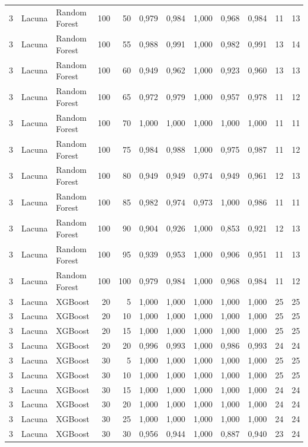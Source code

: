 \begin{longtable}{@{}rllrrrrrrrrr@{}}
3 & Lacuna & Random Forest & 100 & 50 & 0,979 & 0,984 & 1,000 & 0,968 & 0,984 & 11 & 13 \\
3 & Lacuna & Random Forest & 100 & 55 & 0,988 & 0,991 & 1,000 & 0,982 & 0,991 & 13 & 14 \\
3 & Lacuna & Random Forest & 100 & 60 & 0,949 & 0,962 & 1,000 & 0,923 & 0,960 & 13 & 13 \\
3 & Lacuna & Random Forest & 100 & 65 & 0,972 & 0,979 & 1,000 & 0,957 & 0,978 & 11 & 12 \\
3 & Lacuna & Random Forest & 100 & 70 & 1,000 & 1,000 & 1,000 & 1,000 & 1,000 & 11 & 11 \\
3 & Lacuna & Random Forest & 100 & 75 & 0,984 & 0,988 & 1,000 & 0,975 & 0,987 & 11 & 12 \\
3 & Lacuna & Random Forest & 100 & 80 & 0,949 & 0,949 & 0,974 & 0,949 & 0,961 & 12 & 13 \\
3 & Lacuna & Random Forest & 100 & 85 & 0,982 & 0,974 & 0,973 & 1,000 & 0,986 & 11 & 11 \\
3 & Lacuna & Random Forest & 100 & 90 & 0,904 & 0,926 & 1,000 & 0,853 & 0,921 & 12 & 13 \\
3 & Lacuna & Random Forest & 100 & 95 & 0,939 & 0,953 & 1,000 & 0,906 & 0,951 & 11 & 13 \\
3 & Lacuna & Random Forest & 100 & 100 & 0,979 & 0,984 & 1,000 & 0,968 & 0,984 & 11 & 12 \\
3 & Lacuna & XGBoost & 20 & 5 & 1,000 & 1,000 & 1,000 & 1,000 & 1,000 & 25 & 25 \\
3 & Lacuna & XGBoost & 20 & 10 & 1,000 & 1,000 & 1,000 & 1,000 & 1,000 & 25 & 25 \\
3 & Lacuna & XGBoost & 20 & 15 & 1,000 & 1,000 & 1,000 & 1,000 & 1,000 & 25 & 25 \\
3 & Lacuna & XGBoost & 20 & 20 & 0,996 & 0,993 & 1,000 & 0,986 & 0,993 & 24 & 24 \\
3 & Lacuna & XGBoost & 30 & 5 & 1,000 & 1,000 & 1,000 & 1,000 & 1,000 & 25 & 25 \\
3 & Lacuna & XGBoost & 30 & 10 & 1,000 & 1,000 & 1,000 & 1,000 & 1,000 & 25 & 25 \\
3 & Lacuna & XGBoost & 30 & 15 & 1,000 & 1,000 & 1,000 & 1,000 & 1,000 & 24 & 24 \\
3 & Lacuna & XGBoost & 30 & 20 & 1,000 & 1,000 & 1,000 & 1,000 & 1,000 & 24 & 24 \\
3 & Lacuna & XGBoost & 30 & 25 & 1,000 & 1,000 & 1,000 & 1,000 & 1,000 & 24 & 24 \\
3 & Lacuna & XGBoost & 30 & 30 & 0,956 & 0,944 & 1,000 & 0,887 & 0,940 & 23 & 24 \\

\end{longtable}
